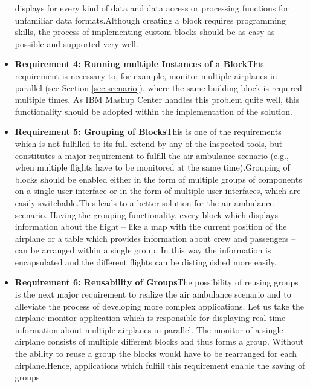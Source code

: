 \begin{itemize}
  displays for every kind of data and data access or processing functions for unfamiliar data
  formats.\newline Although creating a block requires programming skills, the process of
  implementing custom blocks should be as easy as possible and supported very well.
  \item \textbf{Requirement 4: Running multiple Instances of a Block}\newline This requirement
  is necessary to, for example, monitor multiple airplanes in parallel (see Section
  \ref{sec:scenario}), where the same building block is required multiple times. As IBM Mashup
  Center handles this problem quite well, this functionality should be adopted within the
  implementation of the solution.
  \item \textbf{Requirement 5: Grouping of Blocks}\newline This is one of the requirements which is
  not fulfilled to its full extend by any of the inspected tools, but constitutes a major requirement
  to fulfill the air ambulance scenario (e.g., when multiple flights have to be monitored at
  the same time).\newline Grouping of blocks should be enabled either in the form of multiple
  groups of components on a single user interface or in the form of multiple user interfaces, which are
  easily switchable.\newline This leads to a better solution for the air ambulance scenario.
  Having the grouping functionality, every block which displays information about the flight --
  like a map with the current position of the airplane or a table which provides information about
  crew and passengers -- can be arranged within a single group. In this way the information is
  encapsulated and the different flights can be distinguished more easily.
  \item \textbf{Requirement 6: Reusability of Groups}\newline The possibility of reusing groups is
  the next major requirement to realize the air ambulance scenario and to alleviate the process of
  developing more complex applications. Let us take the airplane monitor application which is
  responsible for displaying real-time information about multiple airplanes in parallel. The
  monitor of a single airplane consists of multiple different blocks and thus forms a group.
  Without the ability to reuse a group the blocks would have to be rearranged for each
  airplane.\newline Hence, applications which fulfill this requirement enable the saving of groups

\end{itemize}
